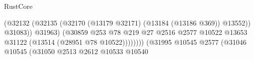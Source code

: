 \begin{lexlean}{RustCore}
\begin{coremodule}
                                                                            (@32132
                                                                              (@32135
                                                                                (@32170
                                                                                  (@13179 @32171)
                                                                                  (@13184
                                                                                    (@13186 @369))
                                                                                  @13552))
                                                                              @31083))
                                                                          @31963)
                                                                        (@30859
                                                                          @253
                                                                          @78
                                                                          @219
                                                                          @27
                                                                          @2516
                                                                          @2577
                                                                          @10522
                                                                          @13653
                                                                          @31122
                                                                          (@13514
                                                                            (@28951
                                                                              @78
                                                                              @10522))))))))
                                                              (@31995
                                                                @10545
                                                                @2577
                                                                (@31046
                                                                  @10545
                                                                  (@31050
                                                                    @2513
                                                                    @2612
                                                                    @10533
                                                                    @10540

\end{coremodule}
\end{lexlean}
